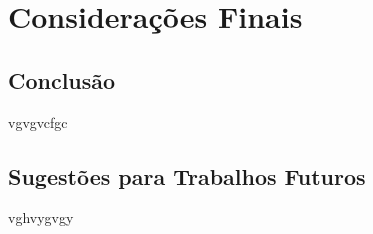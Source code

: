 \chapter{Considerações Finais}

\section{Conclusão}

vgvgvcfgc

\section{Sugestões para Trabalhos Futuros}

 vghvygvgy